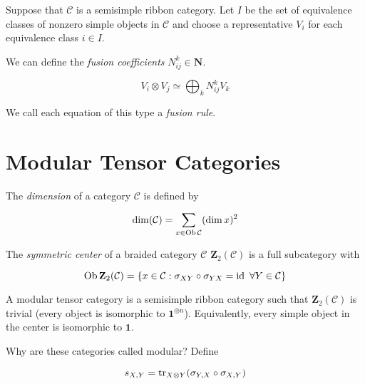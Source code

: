     Suppose that $\mathcal{C}$ is a semisimple ribbon category. Let $I$ be the
    set of equivalence classes of nonzero simple objects in $\mathcal{C}$ and
    choose a representative $V_i$ for each equivalence class  $i \in I$.
    
    We can define the \emph{fusion coefficients} $N_{ij}^k \in \mathbf{N}$.

    \begin{equation}
        V_i \otimes V_j \simeq \bigoplus_k N_{ij}^k V_k
    \end{equation}

    We call each equation of this type a \emph{fusion rule}. 

    \section{Modular Tensor Categories}

The \emph{dimension} of a category $\mathcal{C}$ is defined by 

\begin{equation}
    \operatorname{dim}(\mathcal{C}) = \sum_{ x \in \operatorname{Ob} \mathcal{C}} (\operatorname{dim} x)^2
\end{equation}


\begin{defn}
    The \emph{symmetric center} of a braided category $\mathcal{C}$
    $\mathbf{Z}_2(\mathcal{C})$ is a full subcategory with 

    \begin{equation}
        \operatorname{Ob} \mathbf{Z}_2(\mathcal{C}) = \left\{ x \in \mathcal{C} : \sigma_{XY} \circ \sigma_{YX} = \operatorname{id}\ \forall Y \in \mathcal{C} \right\}
    \end{equation}
\end{defn}

\begin{defn}
    A modular tensor category is a semisimple ribbon category such that
    $\mathbf{Z}_2(\mathcal{C})$ is trivial (every object is isomorphic to
    $\mathbf{1}^{\oplus n}$). Equivalently, every simple object in the center
    is isomorphic to $\mathbf{1}$.  
\end{defn}

Why are these categories called modular? 
Define 

\begin{equation}
    s_{X,Y} = \operatorname{tr}_{X \otimes Y}(\sigma_{Y,X} \circ \sigma_{X,Y})
\end{equation}

